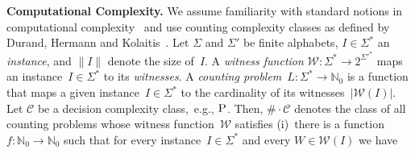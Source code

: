 \documentclass{svproc}
\newcommand{\Nat}{\mathbb{N}} %
\newcommand{\CCard}[1]{\|#1\|}
\newcommand{\Card}[1]{\left|#1\right|}
\renewcommand{\P}{\ensuremath{\textsc{P}}\xspace}
\newcommand{\WWW}{\ensuremath{\mathcal{W}}}%
\newcommand{\mtext}[1]{\ensuremath{\mathcal{#1}}}
\newcommand{\cnt}[0]{\ensuremath{\#}}
\newcommand{\cntc}[0]{\ensuremath{\cnt\cdot}}
\begin{document}
\smallskip\noindent\textbf{Computational Complexity.}
%
%
We assume familiarity with standard notions in
  computational complexity~\cite{Papadimitriou94} and use counting complexity classes
  as defined by Durand, Hermann and
  Kolaitis~\cite{DurandHermannKolaitis05}.
%
%
%
%
%
%
%
%
Let $\Sigma$ and $\Sigma'$ be finite alphabets, $I \in \Sigma^*$ an \emph{instance}, and $\CCard{I}$
 denote the size of~$I$. %
%
%
%
%
A \emph{witness function} %
 $\mathcal{W}: \Sigma^* \rightarrow 2^{{\Sigma'}^*}$ %
maps an instance~$I \in \Sigma^*$ to its \emph{witnesses}. 
A
\emph{counting
  problem}~$L: \Sigma^* \rightarrow \Nat_0$ is a
function that maps a given instance~$I \in \Sigma^*$ to the cardinality of its
witnesses~$\Card{\WWW(I)}$.
%
%
Let $\mtext{C}$ be a decision complexity class,~e.g., \P. Then,
$\cntc\mtext{C}$ denotes the class of all counting problems whose
witness function~$\WWW$ satisfies (i)~there is a
function~$f: \Nat_0 \rightarrow \Nat_0$ such that for every
instance~$I \in \Sigma^*$ and every $W \in \WWW(I)$ we have
\end{document}
